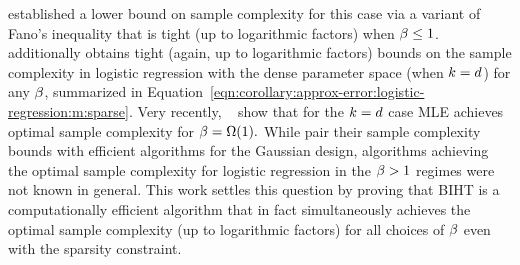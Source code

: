 \cite{hsu2024sample} established a lower bound on sample complexity for this case via a variant of Fano's inequality that is \orderwise tight (up to logarithmic factors) when \(  \beta \leq 1  \).
\cite{hsu2024sample} additionally obtains \orderwise tight (again, up to logarithmic factors) bounds on the sample complexity in logistic regression with the dense parameter space (when \(  k=d  \)) for any \(  \beta  \), summarized in Equation~\eqref{eqn:corollary:approx-error:logistic-regression:m:sparse}.
Very recently, ~\cite{chardon2024finite} show that for the $k= d$ case MLE achieves optimal sample complexity for $\beta = \Omega(1).$
While \cite{plan2012robust,plan2017high}
pair
their sample complexity bounds with efficient algorithms for the Gaussian design, \polytime algorithms achieving the optimal sample complexity for logistic regression in the \(  \beta > 1  \) regimes were not known in general. %
This work settles this question by proving that BIHT is a computationally efficient algorithm that in fact simultaneously achieves the \orderwise optimal sample complexity (up to logarithmic factors) for all choices of \(  \beta  \) even with the sparsity constraint.
